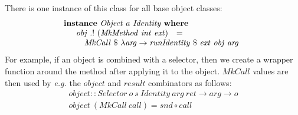 There is one instance of this class for all base object classes:
\begin{displaymath}
\begin{array}{l}
\mathbf{instance}~\mathit{Object}~a~\mathit{Identity}~\mathbf{where}\\
\quad \begin{array}{lcl}
\mathit{obj}~.!~(\mathit{MkMethod}~\mathit{int}~\mathit{ext}) & = & \\
\multicolumn{3}{l}{\quad \mathit{MkCall}~ \$~\lambda \mathit{arg} \to \mathit{runIdentity}~\$~\mathit{ext}~\mathit{obj}~\mathit{arg} } %
\end{array}
\end{array}
\end{displaymath}
For example, if an object is combined with a selector, then we create a wrapper function around the method after applying it to the object. $\mathit{MkCall}$ values are then used by \emph{e.g.} the $\mathit{object}$ and $\mathit{result}$ combinators as follows:
\begin{displaymath}
\begin{array}{l}
\mathit{object} :: \mathit{Selector}~o~s~\mathit{Identity}~\mathit{arg}~\mathit{ret} \to arg \to o\\
\mathit{object}~(\mathit{MkCall}~\mathit{call})  = \mathit{snd} \circ \mathit{call}
\end{array}
\end{displaymath}

